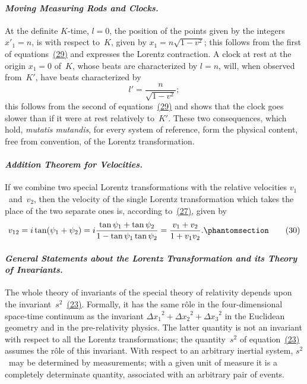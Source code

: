 \documentclass[12pt]{book}[2005/09/16]
\newcommand{\Paragraph}[1]{\paragraph*{\indent\normalfont\itshape#1}}
\newcommand{\PageSep}[1]{\ignorespaces}
\newcommand{\Tag}[1]{%
  \phantomsection
  \label{eqn:#1}
  \tag*{#1}
}
\newcommand{\Eqref}[1]{\hyperref[eqn:#1]{#1}}
\begin{document}
\Paragraph{Moving Measuring Rods and Clocks.} At the definite $K$-time,
%
%
%
$l = 0$, the position of the points given by the integers
${x'}_{1} = n$, is with respect to~$K$, given by $x_{1} = n\sqrt{1 - v^{2}}$;
this follows from the first of equations~\Eqref{(29)} and expresses
the Lorentz contraction. A clock at rest at the origin
$x_{1} = 0$ of~$K$, whose beats are characterized by $l = n$, will,
when observed from~$K'$, have beats characterized by
\[
l' = \frac{n}{\sqrt{1 - v^{2}}};
\]
this follows from the second of equations~\Eqref{(29)} and shows
\PageSep{40}
that the clock goes slower than if it were at rest relatively
to~$K'$. These two consequences, which hold, \textit{mutatis
mutandis}, for every system of reference, form the physical
content, free from convention, of the Lorentz transformation.

\Paragraph{Addition Theorem for Velocities.} If we combine two
%
%
%
special Lorentz transformations with the relative velocities
$v_{1}$~and~$v_{2}$, then the velocity of the single Lorentz transformation
which takes the place of the two separate ones
is, according to~\Eqref{(27)}, given by
\[
v_{12} = i \tan (\psi_{1} + \psi_{2})
  = i \frac{\tan\psi_{1} + \tan\psi_{2}}{1 - \tan\psi_{1} \tan\psi_{2}}
  = \frac{v_{1} + v_{2}}{1 + v_{1}v_{2}}.
\Tag{(30)}
\]

\Paragraph{General Statements about the Lorentz Transformation
and its Theory of Invariants.} The whole theory of
invariants of the special theory of relativity depends upon
the invariant~$s^{2}$~\Eqref{(23)}. Formally, it has the same rôle in
the four-dimensional space-time continuum as the invariant
${\Delta x_{1}}^{2} + {\Delta x_{2}}^{2} + {\Delta x_{3}}^{2}$ in the Euclidean geometry
and in the pre-relativity physics. The latter quantity is
not an invariant with respect to all the Lorentz transformations;
the quantity~$s^{2}$ of equation~\Eqref{(23)} assumes the
rôle of this invariant. With respect to an arbitrary
inertial system, $s^{2}$~may be determined by measurements;
with a given unit of measure it is a completely determinate
quantity, associated with an arbitrary pair of events.
\end{document}
